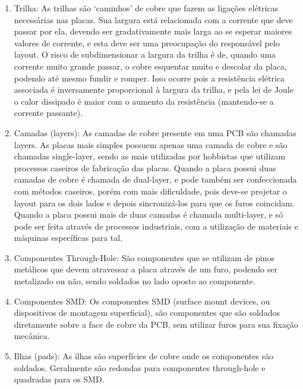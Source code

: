 \begin{enumerate}

\item Trilha: As trilhas s\~ao `caminhos' de cobre que fazem as ligaç\~oes el\'etricas necess\'arias nas placas. Sua largura est\'a relacionada com a corrente que deve passar por ela, devendo ser gradativamente mais larga ao se esperar maiores valores de corrente, e esta deve ser uma preocupaç\~ao do respons\'avel pelo layout. O risco de subdimensionar a largura da trilha \'e de, quando uma corrente muito grande passar, o cobre esquentar muito e descolar da placa, podendo at\'e mesmo fundir e romper. Isso ocorre pois a resist\^encia el\'etrica associada \'e inversamente proporcional \`a largura da trilha, e pela lei de Joule o calor dissipado \'e maior com o aumento da resist\^encia (mantendo-se a corrente passante).

\item Camadas (layers): As camadas de cobre presente em uma PCB s\~ao chamadas layers. As placas mais simples possuem apenas uma camada de cobre e s\~ao chamadas single-layer, sendo as mais utilizadas por hobbistas que utilizam processos caseiros de fabricaç\~ao das placas. Quando a placa possui duas camadas de cobre \'e chamada de dual-layer, e pode tamb\'em ser confeccionada com m\'etodos caseiros, por\'em com mais dificuldade, pois deve-se projetar o layout para os dois lados e depois sincroniz\'a-los para que os furos coincidam. Quando a placa possui mais de duas camadas \'e chamada multi-layer, e s\'o pode ser feita atrav\'es de processos industriais, com a utilizaç\~ao de materiais e m\'aquinas espec\'ificas para tal.

\item Componentes Through-Hole: S\~ao componentes que se utilizam de pinos met\'alicos que devem atravessar a placa atrav\'es de um furo, podendo ser metalizado ou n\~ao, sendo soldados no lado oposto ao componente.

\item Componentes SMD: Os componentes SMD (surface mount devices, ou dispositivos de montagem superficial), s\~ao componentes que s\~ao soldados diretamente sobre a face de cobre da PCB, sem utilizar furos para sua fixaç\~ao mec\^anica.

\item Ilhas (pads): As ilhas s\~ao superf\'icies de cobre onde os componentes s\~ao soldados. Geralmente s\~ao redondas para componentes through-hole e quadradas para os SMD.



\end{enumerate}

